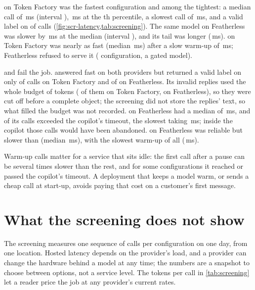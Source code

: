  on Token Factory was the fastest configuration and among the tightest: a median
call of \,ms (interval ),
\,ms at the th percentile, a slowest call of
\,ms, and a valid label on  of
 calls (\cref{fig:scr-latency,tab:screening}). The same model on Featherless was
slower by \,ms at the median (interval ), and
its tail was longer (\,ms).  on Token Factory was nearly as
fast (median \,ms) after a slow warm-up of \,ms;
Featherless refused to serve it ( configuration, a gated model).

 and  fail the job.  answered fast on
both providers but returned a valid label on only  of
 calls on Token Factory and  of
 on Featherless. Its invalid replies used the whole budget of
 tokens ( of them on Token Factory,
 on Featherless), so they were cut off before a complete object; the
screening did not store the replies' text, so what filled the budget was not recorded.  on Featherless had a median of
\,ms, and  of its  calls
exceeded the copilot's timeout, the slowest taking \,ms; inside the copilot those calls
would have been abandoned.  on Featherless was reliable but slower than
 (median \,ms), with the slowest warm-up of all
(\,ms).

Warm-up calls matter for a service that sits idle: the first call after a pause can be several times slower than the
rest, and for some configurations it reached or passed the copilot's timeout. A deployment that keeps a model warm, or sends
a cheap call at start-up, avoids paying that cost on a customer's first message.

\section{What the screening does not show}

The screening measures one sequence of calls per configuration on one day, from one location. Hosted latency depends
on the provider's load, and a provider can change the hardware behind a model at any time; the numbers are a snapshot
to choose between options, not a service level. The tokens per call in \cref{tab:screening} let a reader price the
job at any provider's current rates.
